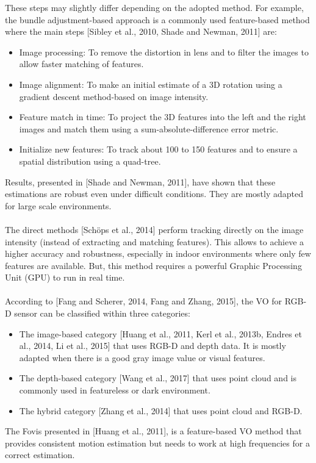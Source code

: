 \documentclass[11pt,openany]{book}
\begin{document}
These steps may slightly differ depending on the adopted method. For example, the bundle adjustment-based approach is a commonly used feature-based method where the main steps [Sibley et al., 2010, Shade and Newman, 2011] are:
\begin{itemize}
    \item Image processing: To remove the distortion in lens and to filter the images to allow faster matching of features.
    \item Image alignment: To make an initial estimate of a 3D rotation using a gradient descent method-based on image intensity.
    \item Feature match in time: To project the 3D features into the left and the right images and match them using a sum-absolute-difference error metric.
    \item Initialize new features: To track about 100 to 150 features and to ensure a spatial distribution using a quad-tree.
\end{itemize}
Results, presented in [Shade and Newman, 2011], have shown that these estimations are robust even under diﬃcult conditions. They are mostly adapted for large scale environments.\\ \\
The direct methods [Schöps et al., 2014] perform tracking directly on the image intensity
(instead of extracting and matching features). This allows to achieve a higher accuracy
and robustness, especially in indoor environments where only few features are available.
But, this method requires a powerful Graphic Processing Unit (GPU) to run in real time.\\\\
According to [Fang and Scherer, 2014, Fang and Zhang, 2015], the VO for RGB-D sensor
can be classiﬁed within three categories:
\begin{itemize}
    \item The image-based category [Huang et al., 2011, Kerl et al., 2013b, Endres et al., 2014, Li et al., 2015] that uses RGB-D and depth data. It is mostly adapted when there is a good gray image value or visual features.
    \item The depth-based category [Wang et al., 2017] that uses point cloud and is commonly used in featureless or dark environment.
    \item The hybrid category [Zhang et al., 2014] that uses point cloud and RGB-D.
\end{itemize}
The Fovis presented in [Huang et al., 2011], is a feature-based VO method that provides consistent motion estimation but needs to work at high frequencies for a correct estimation.\\\\
\end{document}
